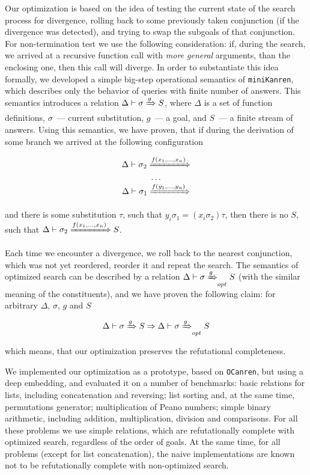 \documentclass[preprint,numbers,10pt]{sigplanconf}
\newcommand{\miniKanren}{\texttt{miniKanren}\xspace}
\newcommand{\ocanren}{\texttt{OCanren}\xspace}
\begin{document}

Our optimization is based on the idea of testing the current state of the search process for divergence, rolling back to some previously taken conjunction
(if the divergence was detected), and trying to swap the subgoals of that conjunction. For non-termination test we use the following consideration: if, during
the search, we arrived at a recursive function call with \emph{more general} arguments, than the enclosing one, then this call will diverge. In order to substantiate
this idea formally, we developed a simple big-step operational semantics of \miniKanren, which describes only the behavior of queries with finite number of answers.
This semantics introduces a relation $\Delta\vdash\sigma\xRightarrow{g} S$, where $\Delta$ is a set of function definitions, $\sigma$~--- current substitution, 
$g$~--- a goal, and $S$~--- a finite stream of answers. Using this semantics, we have proven, that if during the derivation of some branch we arrived at the 
following configuration

$$
\begin{array}{c}
  \Delta\vdash\sigma_2\xRightarrow{f(x_1,\dots,x_n)}\\
  \ldots\\
  \Delta\vdash\sigma_1\xRightarrow{f(y_1,\dots,y_n)} 
\end{array}
$$

\noindent and there is some substitution $\tau$, such that $y_i\sigma_1=(x_i\sigma_2)\tau$, then there is no $S$, such that $\Delta\vdash\sigma_2\xRightarrow{f(x_1,\dots,x_n)} S$.

Each time we encounter a divergence, we roll back to the nearest conjunction, which was not yet reordered, reorder it and repeat the search. The semantics of optimized search 
can be described by a relation $\Delta\vdash\sigma\xRightarrow{g}_{opt} S$ (with the similar meaning of the constituents), and we have proven the following claim: for arbitrary
$\Delta$, $\sigma$, $g$ and $S$ 

$$\Delta\vdash\sigma\xRightarrow{g}S\Rightarrow\Delta\vdash\sigma\xRightarrow{g}_{opt} S$$

\noindent which means, that our optimization preserves the refutational completeness.

We implemented our optimization as a prototype, based on \ocanren, but using a deep embedding, and evaluated it on a number of benchmarks:
basic relations for lists, including concatenation and reversing; list sorting and, at the same time, permutations generator;
multiplication of Peano numbers; simple binary arithmetic, including addition, multiplication, division and comparisons. 
For all these problems we use simple relations, which are refutationally complete with optimized search, regardless of the order of goals. At the same time, 
for all problems (except for list concatenation), the naive implementations are known not to be refutationally complete with non-optimized search.
\end{document}
